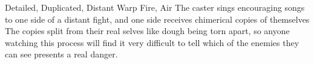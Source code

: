   {Detailed, Duplicated, Distant}%
  {Warp}%
  {Fire, Air}%
  {}%
  {The caster sings encouraging songs to one side of a distant fight, and one side receives chimerical copies of themselves}%
  {The copies split from their real selves like dough being torn apart, so anyone watching this process will find it very difficult to tell which of the enemies they can see presents a real danger.}

